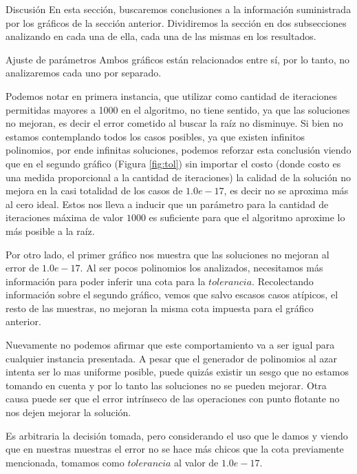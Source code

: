 \begin{section}{Discusión}
	En esta sección, buscaremos conclusiones a la información suministrada por los gráficos de la sección anterior. Dividiremos la sección en dos subsecciones analizando en cada una de ella, cada una de las mismas en los resultados.\\
	
\begin{subsection}{Ajuste de parámetros}
	Ambos gráficos están relacionados entre sí, por lo tanto, no analizaremos cada uno por separado. 
	
	Podemos notar en primera instancia, que utilizar como cantidad de iteraciones permitidas mayores a 1000 en el algoritmo, no tiene sentido, ya que las soluciones no mejoran, es decir el error cometido al buscar la raíz no disminuye. Si bien no estamos contemplando todos los casos posibles, ya que existen infinitos polinomios, por ende infinitas soluciones, podemos reforzar esta conclusión viendo que en el segundo gráfico (Figura \ref{fig:tol}) sin importar el costo (donde costo es una medida proporcional a la cantidad de iteraciones) la calidad de la solución no mejora en la casi totalidad de los casos de $1.0e-17$, es decir no se aproxima más al cero ideal.
	Estos nos lleva a inducir que un parámetro para la cantidad de iteraciones máxima de valor $1000$ es suficiente para que el algoritmo aproxime lo más posible a la raíz.
	
	Por otro lado, el primer gráfico nos muestra que las soluciones no mejoran al error de $1.0e-17$. Al ser pocos polinomios los analizados, necesitamos más información para poder inferir una cota para la $tolerancia$. Recolectando información sobre el segundo gráfico, vemos que salvo escasos casos atípicos, el resto de las muestras, no mejoran la misma cota impuesta para el gráfico anterior.
	
	Nuevamente no podemos afirmar que este comportamiento va a ser igual para cualquier instancia presentada. A pesar que el generador de polinomios al azar intenta ser lo mas uniforme posible, puede quizás existir un sesgo que no estamos tomando en cuenta y por lo tanto las soluciones no se pueden mejorar. Otra causa puede ser que el error intrínseco de las operaciones con punto flotante no nos dejen mejorar la solución.
	
	Es arbitraria la decisión tomada, pero considerando el uso que le damos y viendo que en nuestras muestras el error no se hace más chicos que la cota previamente mencionada, tomamos como $tolerancia$ al valor de $1.0e-17$.
	

\end{subsection}
\end{section}
